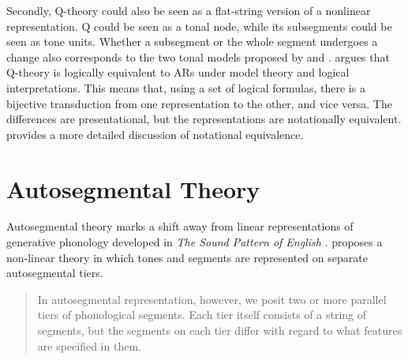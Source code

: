 Secondly, Q-theory could also be seen as a flat-string version of a nonlinear
representation. Q could be seen as a tonal node, while its subsegments could be
seen as tone units. Whether a subsegment or the whole segment undergoes a change
also corresponds to the two tonal models proposed by \citet{yip1980chinese}
 and
\citet{bao1999structure}. \citet{jardine2021qtheory} argues that Q-theory is
logically equivalent to ARs under model theory and logical interpretations. This
means that, using a set of logical formulas, there is a bijective transduction
from one representation to the other, and vice versa. The differences are
presentational, but the representations are notationally equivalent.
\citet{oakdenNotationalEquivalenceTonal2020} provides a more detailed discussion
of notational equivalence.

\section{Autosegmental Theory}

Autosegmental theory marks a shift away from linear representations
of generative phonology developed in \textit{The Sound Pattern of English}
\citep{chomsky1968spe}. \citet{goldsmith1976autosegmental} proposes a
non-linear theory in which tones and segments are represented on separate
autosegmental tiers. 
\begin{quote}
In
autosegmental representation, however, we posit two or more parallel
tiers of phonological segments. Each tier itself consists of a string of
segments, but the segments on each tier differ with regard to what
features are specified in them.	
\citep[p.8]{goldsmith1976autosegmental}
\end{quote}

